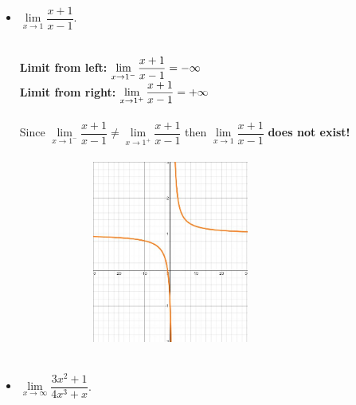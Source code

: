\documentclass[fleqn]{article}
\begin{document}
\begin{enumerate}
\begin{itemize}
      \item $\lim\limits_{x \to 1} \dfrac{x+1}{x-1}$.

        \textcolor{hwColor}{
          \\
          \textbf{Limit from left:}
          $
            \lim\limits_{x \to 1^-} \dfrac{x+1}{x-1}=-\infty
            \\
            \\
          $
          \\
          \textbf{Limit from right:}
          $
            \lim\limits_{x \to 1^+} \dfrac{x+1}{x-1}=+\infty
            \\
            \\
          $
          \\
          \\
          Since $\lim\limits_{x \to 1^-} \dfrac{x+1}{x-1} \neq \lim\limits_{x \to 1^+} \dfrac{x+1}{x-1}$
          then $\lim\limits_{x \to 1} \dfrac{x+1}{x-1}$ \textbf{does not exist!}
          \\
          \\
          \includegraphics[width=10cm, height=6cm]{Four.JPG}
          \\
          \\
        }
      
      \item $\lim\limits_{x \to \infty} \dfrac{3x^2+1}{4x^3+x}$. 


\end{itemize}
\end{enumerate}
\end{document}
